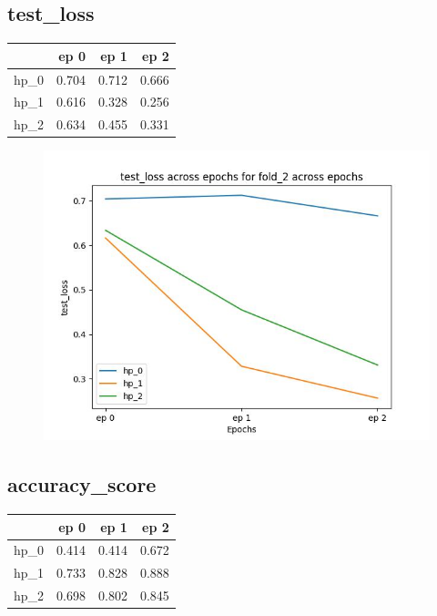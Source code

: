 \documentclass{article}
\begin{document}
\subsection{test\_loss}
\begin{tabular}{lrrr}
\toprule
{} &   ep 0 &   ep 1 &   ep 2 \\
\midrule
hp\_0 &  0.704 &  0.712 &  0.666 \\
hp\_1 &  0.616 &  0.328 &  0.256 \\
hp\_2 &  0.634 &  0.455 &  0.331 \\
\bottomrule
\end{tabular}

\begin{figure}[H]
\includegraphics[scale = 0.75]{fold_2/test_loss}
\end{figure}
\subsection{accuracy\_score}
\begin{tabular}{lrrr}
\toprule
{} &   ep 0 &   ep 1 &   ep 2 \\
\midrule
hp\_0 &  0.414 &  0.414 &  0.672 \\
hp\_1 &  0.733 &  0.828 &  0.888 \\
hp\_2 &  0.698 &  0.802 &  0.845 \\
\bottomrule
\end{tabular}
\end{document}
